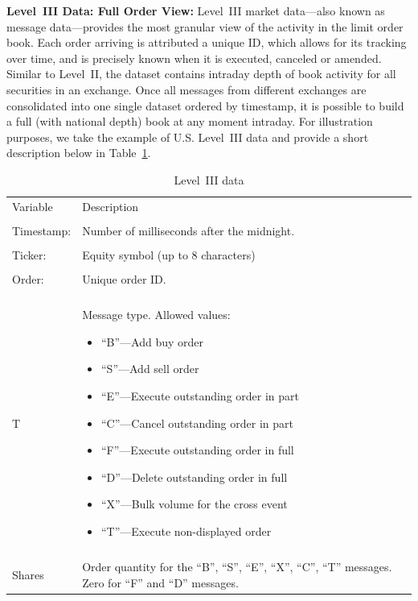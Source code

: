 \noindent\textbf{Level~III Data: Full Order View:} Level~III market data---also known as message data---provides the most granular view of the activity in the limit order book. Each order arriving is attributed a unique ID, which allows for its tracking over time, and is precisely known when it is executed, canceled or amended. Similar to Level~II, the dataset contains intraday depth of book activity for all securities in an exchange. Once all messages from different exchanges are consolidated into one single dataset ordered by timestamp, it is possible to build a full (with national depth) book at any moment intraday. For illustration purposes, we take the example of U.S. Level~III data and provide a short description below in Table~\ref{tab:level3data}. \label{in:level3dat1}
	\begin{table}[!ht]
	\centering
	\caption{Level~III data\label{tab:level3data}}
	\begin{tabular}{lp{}} 
	Variable & Description \\
	& \\
	Timestamp: & Number of milliseconds after the midnight. \\
	& \\
	Ticker: & Equity symbol (up to 8 characters) \\
	& \\
	Order: & Unique order ID. \\
	& \\
	T & Message type. Allowed values: \newline \begin{minipage}[t]{0.6\textwidth} \begin{itemize} \item ``B''---Add buy order \item ``S''---Add sell order \item ``E''---Execute outstanding order in part \item ``C''---Cancel outstanding order in part \item ``F''---Execute outstanding order in full \item ``D''---Delete outstanding order in full \item ``X''---Bulk volume for the cross event \item ``T''---Execute non-displayed order \end{itemize} \end{minipage} \\
	& \\
	Shares & Order quantity for the ``B'', ``S'', ``E'', ``X'', ``C'', ``T'' messages. Zero for ``F'' and ``D'' messages. \\

\end{tabular}
\end{table}
